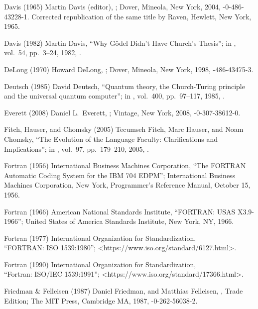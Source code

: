  Davis (1965)
Martin Davis (editor),
;
Dover, Mineola, New York, 2004,
-0-486-43228-1.
Corrected republication of the same title
by Raven, Hewlett, New York, 1965.

 Davis (1982)
Martin Davis,
``Why G\"odel Didn't Have Church's Thesis'';
in ,
vol.\ 54, pp.\ 3--24, 1982,
.

 DeLong (1970)
Howard DeLong,
;
Dover, Mineola, New York, 1998,
-486-43475-3.

 Deutsch (1985)
David Deutsch,
``Quantum theory, the Church-Turing principle and
  the universal quantum computer'';
in ,
 vol.\ 400, pp.\ 97--117, 1985,
.

 Everett (2008)
Daniel L.\ Everett,
;
Vintage, New York, 2008,
-0-307-38612-0.

  Fitch, Hauser, and Chomsky (2005)
Tecumseh Fitch, Marc Hauser, and Noam Chomsky,
``The Evolution of the Language Faculty:
Clarifications and Implications'';
in ,
vol.\ 97, pp.\ 179--210, 2005,
.

 Fortran (1956)
International Business Machines Corporation,
``The FORTRAN Automatic Coding System for the IBM 704 EDPM'';
International Business Machines Corporation, New York,
Programmer's Reference Manual, October 15, 1956.

 Fortran (1966)
American National Standards Institute,
``FORTRAN: USAS X3.9-1966'';
United States of America Standards Institute, New York, NY, 1966.

 Fortran (1977)
International Organization for Standardization,\\
``FORTRAN: ISO 1539:1980'';
\URL<https://www.iso.org/standard/6127.html>.

 Fortran (1990)
International Organization for Standardization,\\
``Fortran: ISO/IEC 1539:1991'';
\URL<https://www.iso.org/standard/17366.html>.

 Friedman \& Felleisen (1987)
Daniel Friedman, and Matthias Felleisen,
, Trade Edition;
The MIT Press, Cambridge MA, 1987,
-0-262-56038-2.

